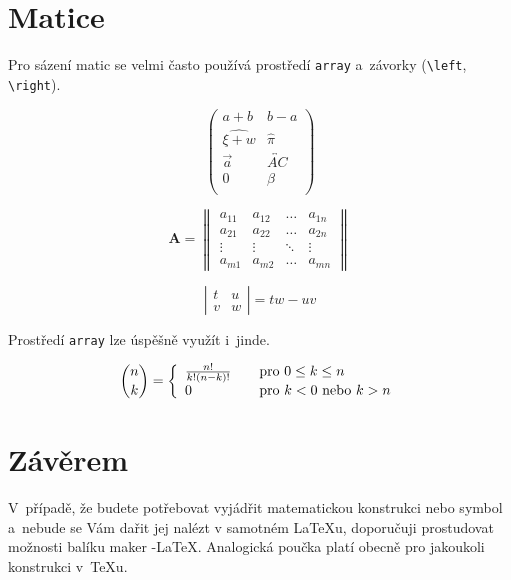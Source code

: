 \documentclass[a4paper, 11pt]{article}
\begin{document}
\section{Matice}

Pro sázení matic se velmi často používá prostředí \verb|array| a~závorky (\verb|\left|, \verb|\right|). 


$$\left( \begin{array}{cc} a + b & b - a \\ \widehat{\xi + w} & \hat{\pi} \\ \vec{a} & \overleftrightarrow{AC} \\ 0 & \beta\\
\end{array} \right)$$


$$\mathbf{A}=\left\|
\begin{array}{cccc}
a_{11} & a_{12} & \ldots & a_{1n}  \\
a_{21} & a_{22} & \dots & a_{2n}    \\
\vdots & \vdots & \ddots & \vdots    \\
a_{m1} & a_{m2} & \ldots & a_{mn}
\end{array}\right\|$$

$$\left|
\begin{array}{cc}
t & u \\ v & w
\end{array}
\right| = tw -uv$$


Prostředí \verb|array| lze úspěšně využít i~jinde.

$$\binom{n}{k} = \left\{
\begin{array}{l l}
	\frac{n!}{k!(n-k)!} & \quad \mbox{pro $0 \leq k \leq n$}	\\
	0 & \quad \mbox{pro $k < 0$ nebo $k > n$}					\\
\end{array} \right. $$

\section{Závěrem}

V~případě, že budete potřebovat vyjádřit matematickou konstrukci nebo symbol a~nebude se Vám dařit jej nalézt v samotném \LaTeX u, doporučuji prostudovat možnosti balíku maker \AmS-\LaTeX.
Analogická poučka platí obecně pro jakoukoli konstrukci v~\TeX u.
\end{document}
